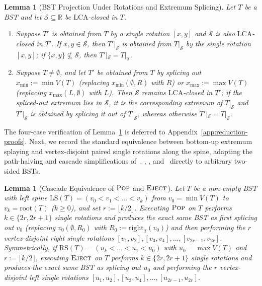 \documentclass[11pt]{article}
\newtheorem{lemma}[theorem]{Lemma}
\theoremstyle{definition}
\theoremstyle{remark}
\newcommand{\LS}{\mathrm{LS}}
\newcommand{\RS}{\mathrm{RS}}
\newcommand{\LCA}{\mathrm{LCA}}
\newcommand{\POP}{\textnormal{\scshape Pop}}
\newcommand{\EJECT}{\textnormal{\scshape Eject}}
\begin{document}
\begin{lemma}[BST Projection Under Rotations and Extremum Splicing]
\label{lem:projection-stub}
Let $T$ be a BST and let $\mathcal{S} \subseteq \mathbb{R}$ be $\LCA$-closed in $T$.
\begin{enumerate}[label=(\arabic*)]
  \item Suppose $T'$ is obtained from $T$ by a single rotation $[x, y]$ and $\mathcal{S}$ is also $\LCA$-closed in $T'$. If $x, y \in \mathcal{S}$, then $T'|_{\mathcal{S}}$ is obtained from $T|_{\mathcal{S}}$ by the single rotation $[x, y]$; if $\{x, y\} \not\subseteq \mathcal{S}$, then $T'|_{\mathcal{S}} = T|_{\mathcal{S}}$.
  \item Suppose $T \ne \emptyset$, and let $T'$ be obtained from $T$ by splicing out $x_{\min} := \min V(T)$ (replacing $x_{\min}(\emptyset, R)$ with $R$) or $x_{\max} := \max V(T)$ (replacing $x_{\max}(L, \emptyset)$ with $L$). Then $\mathcal{S}$ remains $\LCA$-closed in $T'$; if the spliced-out extremum lies in $\mathcal{S}$, it is the corresponding extremum of $T|_{\mathcal{S}}$ and $T'|_{\mathcal{S}}$ is obtained by splicing it out of $T|_{\mathcal{S}}$, whereas otherwise $T'|_{\mathcal{S}} = T|_{\mathcal{S}}$.
\end{enumerate}
\end{lemma}

The four-case verification of Lemma~\ref{lem:projection-stub} is deferred to Appendix~\ref{app:reduction-proofs}. Next, we record the standard equivalence between bottom-up extremum splaying and vertex-disjoint paired single rotations along the spine, adapting the path-halving and cascade simplifications of~\cite{TarjanVanLeeuwen1984}, \cite[Section~2 and Section~3, Lemma~10]{Sundar1992}, \cite{Lucas1992}, and~\cite[Section~2, Observation~2.1]{Pettie2008} directly to arbitrary two-sided BSTs.

\begin{lemma}[Cascade Equivalence of $\POP$ and $\EJECT$]
\label{lem:cascade-equiv}
Let $T$ be a non-empty BST with left spine $\LS(T) = (v_0 < v_1 < \dots < v_k)$ from $v_0 = \min V(T)$ to $v_k = \mathrm{root}(T)$ ($k \ge 0$), and set $r := \lfloor k / 2 \rfloor$. Executing $\POP$ on $T$ performs $k \in \{2r, 2r + 1\}$ single rotations and produces the exact same BST as first splicing out $v_0$ (replacing $v_0(\emptyset, R_0)$ with $R_0 := \mathrm{right}_T(v_0)$) and then performing the $r$ vertex-disjoint right single rotations $[v_1, v_2], [v_3, v_4], \dots, [v_{2r-1}, v_{2r}]$. Symmetrically, if $\RS(T) = (u_k < \dots < u_1 < u_0)$ with $u_0 = \max V(T)$ and $r := \lfloor k / 2 \rfloor$, executing $\EJECT$ on $T$ performs $k \in \{2r, 2r + 1\}$ single rotations and produces the exact same BST as splicing out $u_0$ and performing the $r$ vertex-disjoint left single rotations $[u_1, u_2], [u_3, u_4], \dots, [u_{2r-1}, u_{2r}]$.
\end{lemma}
\end{document}
